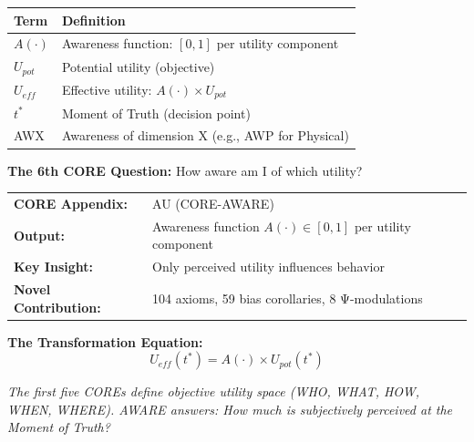 \begin{tcolorbox}[
    colback=gray!5!white,
    colframe=gray!75!black,
    title={\textbf{Begriffe in diesem Kapitel}},
    fonttitle=\bfseries
]
\small
\begin{tabular}{@{}ll@{}}
\textbf{Term} & \textbf{Definition} \\
\midrule
$A(\cdot)$ & Awareness function: $[0,1]$ per utility component \\
$U_{pot}$ & Potential utility (objective) \\
$U_{eff}$ & Effective utility: $A(\cdot) \times U_{pot}$ \\
$t^*$ & Moment of Truth (decision point) \\
AWX & Awareness of dimension X (e.g., AWP for Physical) \\
\end{tabular}
\end{tcolorbox}


\begin{tcolorbox}[
    colback=orange!5!white,
    colframe=orange!75!black,
    title={\textbf{10C CORE Connection: AWARE (Question 6)}},
    fonttitle=\bfseries
]
\textbf{The 6th CORE Question:} How aware am I of which utility?

\medskip
\begin{tabular}{ll}
\textbf{CORE Appendix:} & AU (CORE-AWARE) \\
\textbf{Output:} & Awareness function $A(\cdot) \in [0,1]$ per utility component \\
\textbf{Key Insight:} & Only perceived utility influences behavior \\
\textbf{Novel Contribution:} & 104 axioms, 59 bias corollaries, 8 Ψ-modulations
\end{tabular}

\medskip
\textbf{The Transformation Equation:}
\begin{equation}
\boxed{U_{eff}(t^*) = A(\cdot) \times U_{pot}(t^*)}
\label{eq:transformation}
\end{equation}

\textit{The first five COREs define objective utility space (WHO, WHAT, HOW, WHEN, WHERE). AWARE answers: How much is subjectively perceived at the Moment of Truth?}
\end{tcolorbox}

